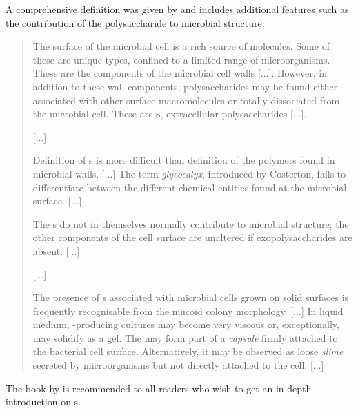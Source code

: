 A comprehensive definition was given by \textcite{Sutherland1990} and includes additional features such as the contribution of the polysaccharide to microbial structure:
\begin{quote}
The surface of the microbial cell is a rich source of \chc{} molecules. Some of these are unique types, confined to a limited range of microorganisms. These are the components of the microbial cell walls [...]. However, in addition to these wall components, polysaccharides may be found either associated with other surface macromolecules or totally dissociated from the microbial cell. These are \textbf{\eps{}s}, extracellular polysaccharides [...].

[...]

Definition of \eps{}s is more difficult than definition of the \chc{} polymers found in microbial walls. [...] The term \textit{glycocalyx}, introduced by Costerton, fails to differentiate between the different chemical entities found at the microbial surface. [...]

The \eps{}s do not in themselves normally contribute to microbial structure; the other components of the cell surface are unaltered if exopolysaccharides are absent. [...]

[...]

The presence of \eps{}s associated with microbial cells grown on solid surfaces is frequently recognisable from the mucoid colony morphology. [...] In liquid medium, \eps{}-producing cultures may become very viscous or, exceptionally, may solidify as a gel. The \eps{} may form part of a \textit{capsule} firmly attached to the bacterial cell surface. Alternatively, it may be observed as loose \textit{slime} secreted by microorganisms but not directly attached to the cell. [...]
\end{quote}
The book by \textcite{Sutherland1990} is recommended to all readers who wish to get an in-depth introduction on \eps{}s.

